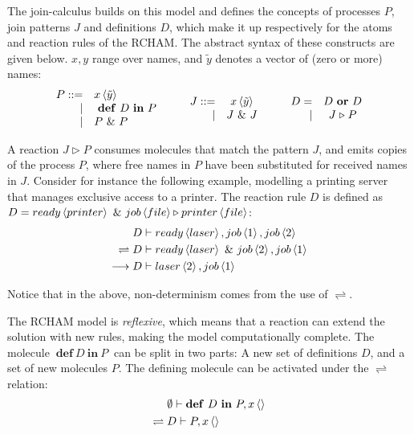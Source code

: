 The join-calculus builds on this model and defines the concepts of processes
$P$, join patterns $J$ and definitions $D$, which make it up respectively for
the atoms and reaction rules of the RCHAM. The abstract syntax of these
constructs are given below. $x,y$ range over names, and $\tilde y$ denotes a
vector of (zero or more) names:
\begin{displaymath}
\begin{array}{rl}
  P ::=& \atm x < \tilde y > \\
 |& \defJ D \inJ P\\
 |& P \andJ P
\end{array}\qquad
\begin{array}{rc}
  J ::=& \atm x < \tilde y > \\
 |& J \andJ J
\end{array}\qquad
\begin{array}{rc}
  D =& D \orJ D \\
 |& J \toJ{} P
\end{array}
\end{displaymath}

A reaction $J \triangleright P$ consumes molecules that match the pattern $J$,
and emits copies of the process $P$, where free names in $P$ have been
substituted for received names in $J$. Consider for instance the following
example, modelling a printing server that manages exclusive access to a printer.
The reaction rule $D$ is defined as $D = \atm ready<printer> ~\&~ \atm job<file>
\triangleright \atm printer<file>$:
\begin{align*}
  & D \vdash \atm ready<laser>, \atm job<1>, \atm job<2> \\
\rightleftharpoons{}& D \vdash \atm ready<laser> ~\&~ \atm job<2>, \atm job<1> \\
\longrightarrow{}& D \vdash \atm laser<2>, \atm job<1>
\end{align*}

Notice that in the above, non-determinism comes from the use of $\rightleftharpoons$.

The RCHAM model is \emph{reflexive}, which means that a reaction can extend the
solution with new rules, making the model computationally complete. The molecule
$\ \mathbf{def}~D~\mathbf{in}~P \ $ can be split in two parts: A new set of
definitions $D$, and a set of new molecules $P$. The defining molecule can be
activated under the $\rightleftharpoons$ relation:
\begin{align*}
 & \emptyset \vdash \mathbf{def}~D~\mathbf{in}~P, \atm x<> \\
\rightleftharpoons{}& D \vdash P, \atm x<>
\end{align*}

